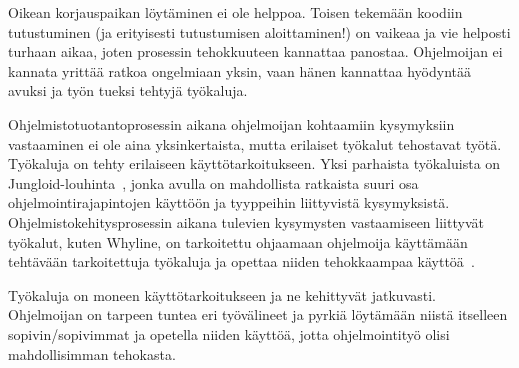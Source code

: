 \documentclass[finnish]{tktltiki2}
\theoremstyle{definition}
\theoremstyle{remark}
\begin{document}
Oikean korjauspaikan löytäminen ei ole helppoa. Toisen tekemään koodiin tutustuminen (ja erityisesti tutustumisen aloittaminen!) on vaikeaa ja vie helposti turhaan aikaa, joten prosessin tehokkuuteen kannattaa panostaa. Ohjelmoijan ei kannata yrittää ratkoa ongelmiaan yksin, vaan hänen kannattaa hyödyntää avuksi ja työn tueksi tehtyjä työkaluja.

Ohjelmistotuotantoprosessin aikana ohjelmoijan kohtaamiin kysymyksiin vastaaminen ei ole aina yksinkertaista, mutta erilaiset työkalut tehostavat työtä. Työkaluja on tehty erilaiseen käyttötarkoitukseen. Yksi parhaista työkaluista on Jungloid-louhinta~\cite{jungloid-mining}, jonka avulla on mahdollista ratkaista suuri osa ohjelmointirajapintojen käyttöön ja tyyppeihin liittyvistä kysymyksistä. Ohjelmistokehitysprosessin aikana tulevien kysymysten vastaamiseen liittyvät työkalut, kuten Whyline, on tarkoitettu ohjaamaan ohjelmoija käyttämään tehtävään tarkoitettuja työkaluja ja opettaa niiden tehokkaampaa käyttöä~\cite{whyline}.

Työkaluja on moneen käyttötarkoitukseen ja ne kehittyvät jatkuvasti. Ohjelmoijan on tarpeen tuntea eri työvälineet ja pyrkiä löytämään niistä itselleen sopivin/sopivimmat ja opetella niiden käyttöä, jotta ohjelmointityö olisi mahdollisimman tehokasta.

\newpage


\end{document}

